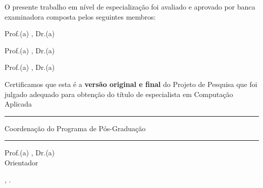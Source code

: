 	

\begin{center}
    \textbf{\autor}
\end{center}

\vspace{0.5cm}

\begin{center}	
	\textbf{\textsc{\titulo}}
\end{center}
\vspace{0.5cm}
\begin{center}

O presente trabalho em nível de especialização foi avaliado e aprovado por banca examinadora composta pelos seguintes membros:
\vspace{0.5cm}

Prof.(a) \orientador, Dr.(a)\\
\instituicao
\vspace{0.5cm}


Prof.(a) \membroInterno, Dr.(a) \\
\instituicao
\vspace{0.5cm}


Prof.(a) \membroExterno, Dr.(a) \\
\instituicaoExterno
\vspace{0.5cm}

\end{center} 

Certificamos que esta é a \textbf{versão original e final} do Projeto de Pesquisa que foi julgado adequado para obtenção do título de especialista em Computação Aplicada


\vspace{1.cm}

\begin{center}
    
    \rule{9cm}{1pt} %
    
	Coordenação do Programa de Pós-Graduação
    
    
    \vspace{1.5cm}
    
    \rule{9cm}{1pt} %
    
    Prof.(a) \orientador, Dr.(a)\\
    Orientador
    
  
\end{center}



\vfill

\vspace{1.0cm}

\begin{center}
	\cidade , \ano.
\end{center}

\setcounter{page}{3} %
\newpage



